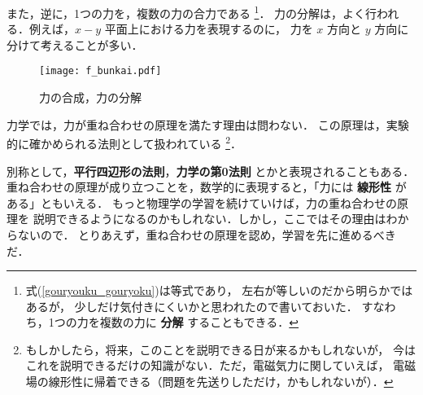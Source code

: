             また，逆に，1つの力を，複数の力の合力である
                \footnote{
                    式(\ref{gouryouku_gouryoku})は等式であり，
                    左右が等しいのだから明らかではあるが，
                    少しだけ気付きにくいかと思われたので書いておいた．
                    すなわち，1つの力を複数の力に \textbf{分解} することもできる．
                    }．
            力の分解は，よく行われる．例えば，$x-y$ 平面上における力を表現するのに，
            力を $x$ 方向と $y$ 方向に分けて考えることが多い．
                \begin{figure}[hbt]
                    \begin{center}
                        \texttt{[image: f\_bunkai.pdf]}
                        \caption{力の合成，力の分解}
                        \label{fig:f_bunkai}
                    \end{center}
                \end{figure}

            力学では，力が重ね合わせの原理を満たす理由は問わない．
            この原理は，実験的に確かめられる法則として扱われている
                \footnote{
                    もしかしたら，将来，このことを説明できる日が来るかもしれないが，
                    今はこれを説明できるだけの知識がない．ただ，電磁気力に関していえば，
                    電磁場の線形性に帰着できる（問題を先送りしただけ，かもしれないが）．
                }．

            別称として，\textbf{平行四辺形の法則}，\textbf{力学の第0法則} とかと表現されることもある．
            重ね合わせの原理が成り立つことを，数学的に表現すると，「力には \textbf{線形性} がある」ともいえる．
            もっと物理学の学習を続けていけば，力の重ね合わせの原理を
            説明できるようになるのかもしれない．しかし，ここではその理由はわからないので．
            とりあえず，重ね合わせの原理を認め，学習を先に進めるべきだ．

